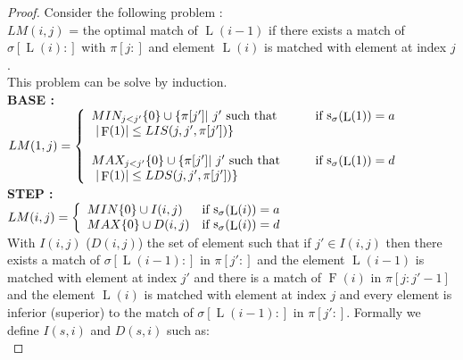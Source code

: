 \documentclass[a4paper]{llncs}
\newcommand{\ptext}{\pi}
\newcommand{\pmotif}{\sigma}
\DeclareMathOperator{\stripea}{s}
\newcommand{\stripe}[2]{\stripea_{{#1}}({#2})}
\newcommand{\dstep}{d}
\newcommand{\ustep}{a}
\DeclareMathOperator{\firsta}{L}
\newcommand{\first}[1]{\firsta({#1})}
\DeclareMathOperator{\factora}{F}
\newcommand{\factor}[1]{\factora({#1})}
\begin{document}
\begin{proof}
Consider the following problem :\\
$LM(i,j)$ = the optimal match of $\first{i-1}$	
	if there exists a match of $\pmotif[\first{i}:]$ 
	with $\ptext[j:]$
	and element $\first{i}$ 
	is matched with element at index $j$.\\
	
This problem can be solve by induction.\\
			
\textbf{BASE :} \\
$LM(1,j)= \left\{ 
	\begin{array}{l l}
	
		MIN_{j<j'}\{0\} \cup \{\ptext[j'] |\text{ $j'$ such that \indent } & 
		\text{if $\stripe{\pmotif}{\first{1}}=\ustep$}\\
		\text{ $|\factor{1}| \leq LIS(j,j',\ptext[j'])  $}\}&\\			
	
	
		&\\
		
		MAX_{j<j'}\{0\} \cup \{\ptext[j'] |\text{ $j'$ such that \indent } &
		\text{if $\stripe{\pmotif}{\first{1}}=\dstep$} \\
		\text{ $|\factor{1}| \leq LDS(j,j',\ptext[j']) $}\}&\\			
	
	\end{array} \right. $\\	

\textbf{STEP :} \\
$LM(i,j)= \left\{ 
	\begin{array}{l l}
	
		MIN \{0\} \cup  I(i,j) & 
		\text{if $\stripe{\pmotif}{\first{i}}=\ustep$}\\

		
		MAX \{0\} \cup  D(i,j) & 
		\text{if $\stripe{\pmotif}{\first{i}}=\dstep$}\\

		
							
	\end{array} \right. $\\
					
With $I(i,j)$ ($D(i,j)$) the set of element such that
if  $j' \in I(i,j)$ then there exists 
a match of $\pmotif[\first{i-1}:]$ in $\ptext[j':]$ and
the element $\first{i-1}$ is matched with element at index $j'$ and
there is a match of $\factor{i}$ in $\ptext[j:j'-1]$ and
the element $\first{i}$ is matched with element at index $j$ and every element is inferior (superior) to the match of  
$\pmotif[\first{i-1}:]$ in $\ptext[j':]$.
Formally we define $I(s,i)$ and $D(s,i)$ such as:\\
			

\end{proof}
\end{document}

